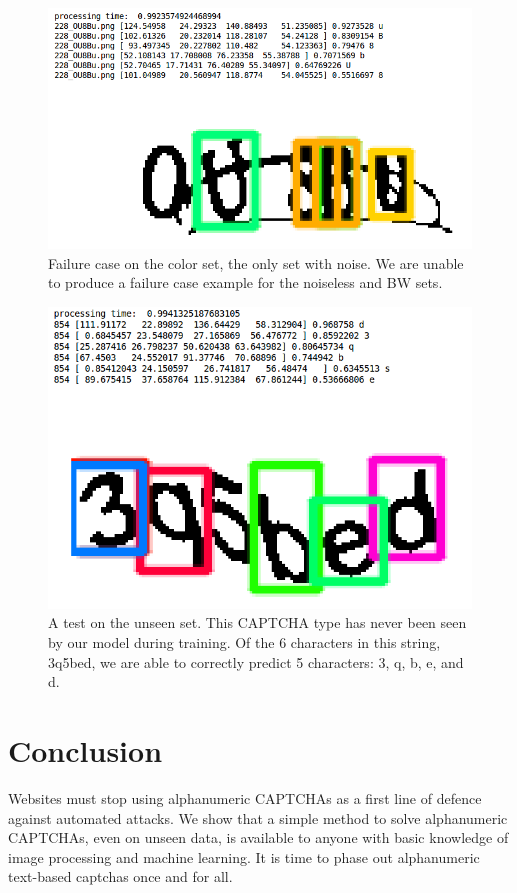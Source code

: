 \documentclass[twocolumn,10pt]{article}
\begin{document}
\begin{figure}
  \centering
  \includegraphics[width=\linewidth]{failurecolor.png}
\caption{Failure case on the color set, the only set with noise. We are unable to produce a failure case example for the noiseless and BW sets.}
\label{fig:failure}
\end{figure}

\begin{figure}
  \centering
  \includegraphics[width=\linewidth]{unseen.png}
\caption{A test on the unseen set. This CAPTCHA type has never been seen by our model during training. Of the 6 characters in this string, 3q5bed, we are able to correctly predict 5 characters: 3, q, b, e, and d.}
\label{fig:unseen}
\end{figure}


\section{Conclusion}
Websites must stop using alphanumeric CAPTCHAs as a first line of defence against automated attacks. We show that a simple method to solve alphanumeric CAPTCHAs, even on unseen data, is available to anyone with basic knowledge of image processing and machine learning. It is time to phase out alphanumeric text-based captchas once and for all.

{}

\end{document}
